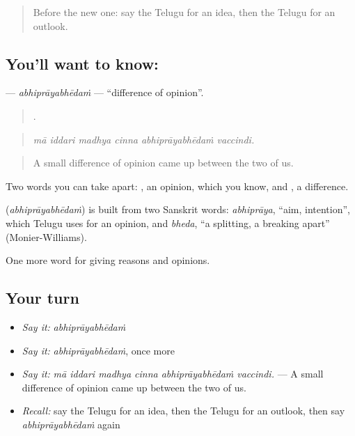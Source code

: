 \label{lesson:TE-C382-abhiprayabhedam}



\begin{quote}
Before the new one: say the Telugu for an idea, then the Telugu for an outlook.
\end{quote}

\subsection*{You'll want to know: }
\textbf{} — \emph{abhiprāyabhēdaṁ} — \textquotedblleft{}difference of opinion\textquotedblright{}.

\begin{quote}
     .
\end{quote}

\begin{quote}
\emph{mā iddari madhya cinna abhiprāyabhēdaṁ vaccindi.}
\end{quote}

\begin{quote}
A small difference of opinion came up between the two of us.
\end{quote}

Two words you can take apart: , an opinion, which you know, and , a difference.

\begin{cousinweb}
\textbf{} (\emph{abhiprāyabhēdaṁ}) is built from two Sanskrit words: \emph{abhiprāya}, \textquotedblleft{}aim, intention\textquotedblright{}, which Telugu uses for an opinion, and \emph{bheda}, \textquotedblleft{}a splitting, a breaking apart\textquotedblright{} (Monier-Williams).
\end{cousinweb}

\begin{grammarlens}[title={What you've built}]
One more word for giving reasons and opinions.
\end{grammarlens}

\subsection*{Your turn}
\begin{itemize}
\raggedright
  \item \emph{Say it:} \emph{abhiprāyabhēdaṁ}
  \item \emph{Say it:} \emph{abhiprāyabhēdaṁ}, once more
  \item \emph{Say it:} \emph{mā iddari madhya cinna abhiprāyabhēdaṁ vaccindi.} — A small difference of opinion came up between the two of us.
  \item \emph{Recall:} say the Telugu for an idea, then the Telugu for an outlook, then say \emph{abhiprāyabhēdaṁ} again
\end{itemize}

